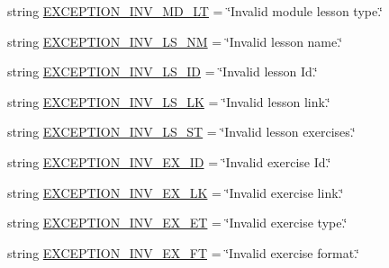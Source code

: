 \begin{DoxyCompactItemize}
\item 
string \hyperlink{namespaceELO_1_1lang_1_1en__us_a8c3ee36e41be8f3467fdc97de914b2dd}{E\-X\-C\-E\-P\-T\-I\-O\-N\-\_\-\-I\-N\-V\-\_\-\-M\-D\-\_\-\-L\-T} = \char`\"{}Invalid module lesson type.\char`\"{}
\item 
string \hyperlink{namespaceELO_1_1lang_1_1en__us_af86904924c8547dcf2c5f48efd4dd774}{E\-X\-C\-E\-P\-T\-I\-O\-N\-\_\-\-I\-N\-V\-\_\-\-L\-S\-\_\-\-N\-M} = \char`\"{}Invalid lesson name.\char`\"{}
\item 
string \hyperlink{namespaceELO_1_1lang_1_1en__us_a3dc7226eeaad87a62a9fbb273d4fe7e2}{E\-X\-C\-E\-P\-T\-I\-O\-N\-\_\-\-I\-N\-V\-\_\-\-L\-S\-\_\-\-I\-D} = \char`\"{}Invalid lesson Id.\char`\"{}
\item 
string \hyperlink{namespaceELO_1_1lang_1_1en__us_a82ec91d82a7aa85c36696b1d12935610}{E\-X\-C\-E\-P\-T\-I\-O\-N\-\_\-\-I\-N\-V\-\_\-\-L\-S\-\_\-\-L\-K} = \char`\"{}Invalid lesson link.\char`\"{}
\item 
string \hyperlink{namespaceELO_1_1lang_1_1en__us_a9cd8c0ce1a4ede3374c3a39446c7e67e}{E\-X\-C\-E\-P\-T\-I\-O\-N\-\_\-\-I\-N\-V\-\_\-\-L\-S\-\_\-\-S\-T} = \char`\"{}Invalid lesson exercises.\char`\"{}
\item 
string \hyperlink{namespaceELO_1_1lang_1_1en__us_a4cedce11626465b38dbef3b092b00d5d}{E\-X\-C\-E\-P\-T\-I\-O\-N\-\_\-\-I\-N\-V\-\_\-\-E\-X\-\_\-\-I\-D} = \char`\"{}Invalid exercise Id.\char`\"{}
\item 
string \hyperlink{namespaceELO_1_1lang_1_1en__us_a8f847718aa9ec2ca19868d79f9823786}{E\-X\-C\-E\-P\-T\-I\-O\-N\-\_\-\-I\-N\-V\-\_\-\-E\-X\-\_\-\-L\-K} = \char`\"{}Invalid exercise link.\char`\"{}
\item 
string \hyperlink{namespaceELO_1_1lang_1_1en__us_a2ad383befeac19349dc5144dde346a69}{E\-X\-C\-E\-P\-T\-I\-O\-N\-\_\-\-I\-N\-V\-\_\-\-E\-X\-\_\-\-E\-T} = \char`\"{}Invalid exercise type.\char`\"{}
\item 
string \hyperlink{namespaceELO_1_1lang_1_1en__us_a079adffcae8ac858667b955cb56d75b3}{E\-X\-C\-E\-P\-T\-I\-O\-N\-\_\-\-I\-N\-V\-\_\-\-E\-X\-\_\-\-F\-T} = \char`\"{}Invalid exercise format.\char`\"{}
\end{DoxyCompactItemize}


